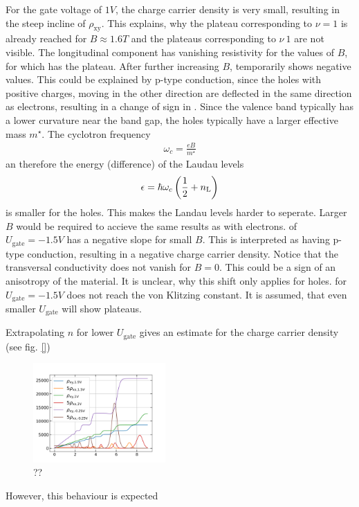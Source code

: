 For the gate voltage of $1V$, the charge carrier density is very small, resulting in the steep incline of $\rho_\text{xy}$.
This explains, why the plateau corresponding to $\nu=1$ is already reached for $B\approx1.6T$ and 
the plateaus corresponding to  $\nu\>1$ are not visible.
The longitudinal component has vanishing resistivity for the values of $B$, for which \rhall has the plateau.  
After further increasing $B$, \rhall temporarily shows negative values.
This could be explained by p-type conduction, since the holes with positive charges, 
moving in the other direction are deflected in the same direction as electrons, resulting in a change of sign in \rhall.
Since the valence band typically has a lower curvature near the band gap, the holes typically have a larger effective mass $m^\star$.
The cyclotron frequency
\begin{align}
    \omega_c = \frac{eB}{m^\star}    
\end{align}
an therefore the energy (difference) of the Laudau levels
\begin{align}
    \epsilon = \hbar \omega_c \left(\frac{1}{2} + n_\text L \right)
\end{align}
is smaller for the holes.
This makes the Landau levels harder to seperate. 
Larger $B$ would be required to accieve the same results as with electrons.
\rhall of $U_\text{gate} = -1.5V$ has a negative slope for small $B$.
This is interpreted as having p-type conduction, resulting in a negative charge carrier density.
Notice that the transversal conductivity does not vanish for $B=0$.
This could be a sign of an anisotropy of the material.
It is unclear, why this shift only applies for holes.
\rhall for $U_\text{gate} = -1.5V$ does not reach the von Klitzing constant.
It is assumed, that even smaller $U_\text{gate}$ will show plateaus. 

Extrapolating $n$ for lower $U_\text{gate}$ gives an estimate for the charge carrier density (see fig. \ref{})
\begin{figure}[h]
    \centering
    \includegraphics[width=0.45\textwidth]{../Images/differentGateVoltagesQHE.png}
    \caption{??}
    \label{fig:differentGateVoltagesQHE}
\end{figure}




However, this behaviour is expected     


